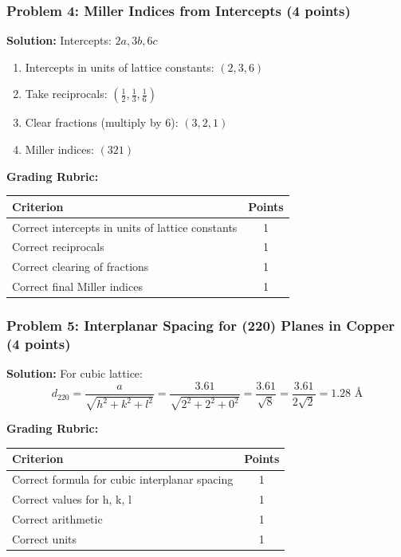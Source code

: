 \documentclass[12pt,a4paper]{article}
\begin{document}
\subsubsection*{Problem 4: Miller Indices from Intercepts (4 points)}
\textbf{Solution:}
Intercepts: $2a, 3b, 6c$
\begin{enumerate}
    \item Intercepts in units of lattice constants: $(2, 3, 6)$
    \item Take reciprocals: $(\frac{1}{2}, \frac{1}{3}, \frac{1}{6})$
    \item Clear fractions (multiply by 6): $(3, 2, 1)$
    \item Miller indices: $(321)$
\end{enumerate}

\textbf{Grading Rubric:}
\begin{table}[h]
\centering
\begin{tabular}{|p{10cm}|c|}
\hline
\textbf{Criterion} & \textbf{Points} \\
\hline
Correct intercepts in units of lattice constants & 1 \\
Correct reciprocals & 1 \\
Correct clearing of fractions & 1 \\
Correct final Miller indices & 1 \\
\hline
\end{tabular}
\end{table}

\subsubsection*{Problem 5: Interplanar Spacing for (220) Planes in Copper (4 points)}
\textbf{Solution:}
For cubic lattice:
\[d_{220} = \frac{a}{\sqrt{h^2 + k^2 + l^2}} = \frac{3.61}{\sqrt{2^2 + 2^2 + 0^2}} = \frac{3.61}{\sqrt{8}} = \frac{3.61}{2\sqrt{2}} = 1.28 \text{ \AA}\]

\textbf{Grading Rubric:}
\begin{table}[h]
\centering
\begin{tabular}{|p{10cm}|c|}
\hline
\textbf{Criterion} & \textbf{Points} \\
\hline
Correct formula for cubic interplanar spacing & 1 \\
Correct values for h, k, l & 1 \\
Correct arithmetic & 1 \\
Correct units & 1 \\
\hline
\end{tabular}
\end{table}
\end{document}
